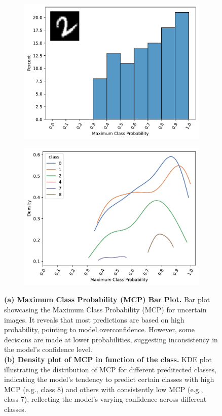 \begin{figure}[H]
    \centering
    \begin{subfigure}{0.45\textwidth}
        \includegraphics[width=\textwidth]{MCP_barplot.pdf}
        \caption{}
        \label{fig:MCP:barplot}
    \end{subfigure}%
    \begin{subfigure}{0.45\textwidth}
        \includegraphics[width=\textwidth]{MCP_kdeplot.pdf}
        \caption{}
        \label{fig:MCP:kdeplot}
    \end{subfigure}%
    \caption{\textbf{(a) Maximum Class Probability (MCP) Bar Plot.} Bar plot showcasing the Maximum Class Probability (MCP) for uncertain images. It reveals that most predictions are based on high probability, pointing to model overconfidence. However, some decisions are made at lower probabilities, suggesting inconsistency in the model's confidence level.\\\textbf{(b) Density plot of MCP in function of the class.} KDE plot illustrating the distribution of MCP for different preditected classes, indicating the model's tendency to predict certain classes with high MCP (e.g., class 8) and others with consistently low MCP (e.g., class 7), reflecting the model's varying confidence across different classes.}
    \label{fig:MCP}
\end{figure}

